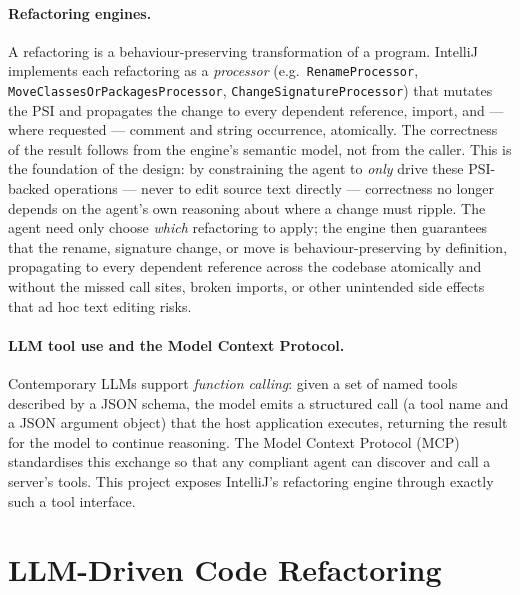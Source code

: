 \paragraph{Refactoring engines.} A refactoring is a behaviour-preserving
transformation of a program. IntelliJ implements each refactoring as a
\emph{processor} (e.g.\ \texttt{RenameProcessor},
\texttt{MoveClassesOrPackagesProcessor}, \texttt{ChangeSignatureProcessor})
that mutates the PSI and propagates the change to every dependent reference,
import, and --- where requested --- comment and string occurrence, atomically.
The correctness of the result follows from the engine's semantic model, not from
the caller. This is the foundation of the design: by constraining the agent to \emph{only}
drive these PSI-backed operations --- never to edit source text directly ---
correctness no longer depends on the agent's own reasoning about where a change
must ripple. The agent need only choose \emph{which} refactoring to apply; the
engine then guarantees that the rename, signature change, or move is
behaviour-preserving by definition, propagating to every dependent reference
across the codebase atomically and without the missed call sites, broken imports,
or other unintended side effects that ad hoc text editing risks.

\paragraph{LLM tool use and the Model Context Protocol.} Contemporary LLMs
support \emph{function calling}: given a set of named tools described by a JSON
schema, the model emits a structured call (a tool name and a JSON argument
object) that the host application executes, returning the result for the model
to continue reasoning. The Model Context Protocol (MCP) standardises this
exchange so that any compliant agent can discover and call a server's tools.
This project exposes IntelliJ's refactoring engine through exactly such a
tool interface.

\section{LLM-Driven Code Refactoring}
\label{sec:bg-llm-refactoring}

